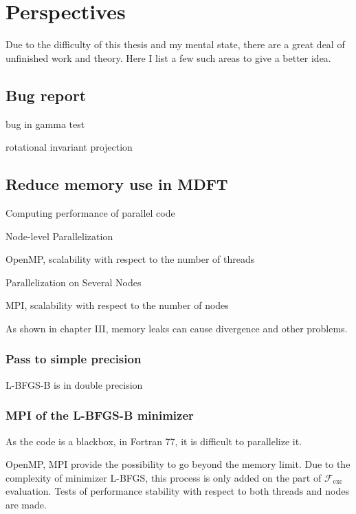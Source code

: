 
\chapter{Perspectives\label{chpt:perspectives}}

Due to the difficulty of this thesis and my mental state, there are %
a great deal of unfinished work and theory. Here I list a few such areas to give a better idea.

\section{Bug report}

bug in gamma test

rotational invariant projection

\section{Reduce memory use in MDFT}

Computing performance of parallel code

Node-level Parallelization

OpenMP, scalability with respect to the number of threads

Parallelization on Several Nodes

MPI, scalability with respect to the number of nodes

As shown in chapter III, memory leaks can cause divergence and other
problems.

\subsection{Pass to simple precision}

L-BFGS-B is in double precision

\subsection{MPI of the L-BFGS-B minimizer}

As the code is a blackbox, in Fortran 77, it is difficult to parallelize
it. 

OpenMP, MPI provide the possibility to go beyond the memory limit.
Due to the complexity of minimizer L-BFGS, this process is only added
on the part of $\mathcal{F}_{\mathrm{exc}}$ evaluation. Tests of
performance stability with respect to both threads and nodes are made.

